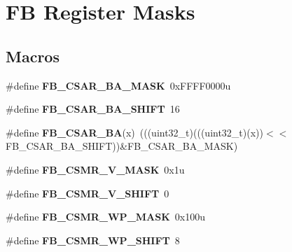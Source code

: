 \hypertarget{group__FB__Register__Masks}{}\section{FB Register Masks}
\label{group__FB__Register__Masks}
\subsection*{Macros}
\begin{DoxyCompactItemize}
\item 
\#define {\bfseries F\+B\+\_\+\+C\+S\+A\+R\+\_\+\+B\+A\+\_\+\+M\+A\+SK}~0x\+F\+F\+F\+F0000u\hypertarget{group__FB__Register__Masks_ga917335c957f6472faf91ae0b244db487}{}\label{group__FB__Register__Masks_ga917335c957f6472faf91ae0b244db487}

\item 
\#define {\bfseries F\+B\+\_\+\+C\+S\+A\+R\+\_\+\+B\+A\+\_\+\+S\+H\+I\+FT}~16\hypertarget{group__FB__Register__Masks_ga098f6109a1dcc8cc007bca53c312810f}{}\label{group__FB__Register__Masks_ga098f6109a1dcc8cc007bca53c312810f}

\item 
\#define {\bfseries F\+B\+\_\+\+C\+S\+A\+R\+\_\+\+BA}(x)~(((uint32\+\_\+t)(((uint32\+\_\+t)(x))$<$$<$F\+B\+\_\+\+C\+S\+A\+R\+\_\+\+B\+A\+\_\+\+S\+H\+I\+FT))\&F\+B\+\_\+\+C\+S\+A\+R\+\_\+\+B\+A\+\_\+\+M\+A\+SK)\hypertarget{group__FB__Register__Masks_ga711f226d59ad769fe5112524c7dc7b66}{}\label{group__FB__Register__Masks_ga711f226d59ad769fe5112524c7dc7b66}

\item 
\#define {\bfseries F\+B\+\_\+\+C\+S\+M\+R\+\_\+\+V\+\_\+\+M\+A\+SK}~0x1u\hypertarget{group__FB__Register__Masks_ga746554e800a78e64f18c333f8b3dbd2c}{}\label{group__FB__Register__Masks_ga746554e800a78e64f18c333f8b3dbd2c}

\item 
\#define {\bfseries F\+B\+\_\+\+C\+S\+M\+R\+\_\+\+V\+\_\+\+S\+H\+I\+FT}~0\hypertarget{group__FB__Register__Masks_ga62bde86e3e74e677b6cb555c806d1dc3}{}\label{group__FB__Register__Masks_ga62bde86e3e74e677b6cb555c806d1dc3}

\item 
\#define {\bfseries F\+B\+\_\+\+C\+S\+M\+R\+\_\+\+W\+P\+\_\+\+M\+A\+SK}~0x100u\hypertarget{group__FB__Register__Masks_ga40725292274706aa0a0c013201498f4b}{}\label{group__FB__Register__Masks_ga40725292274706aa0a0c013201498f4b}

\item 
\#define {\bfseries F\+B\+\_\+\+C\+S\+M\+R\+\_\+\+W\+P\+\_\+\+S\+H\+I\+FT}~8\hypertarget{group__FB__Register__Masks_ga6d49da1d3aabbb8619673ac0fba95dd1}{}\label{group__FB__Register__Masks_ga6d49da1d3aabbb8619673ac0fba95dd1}


\end{DoxyCompactItemize}
